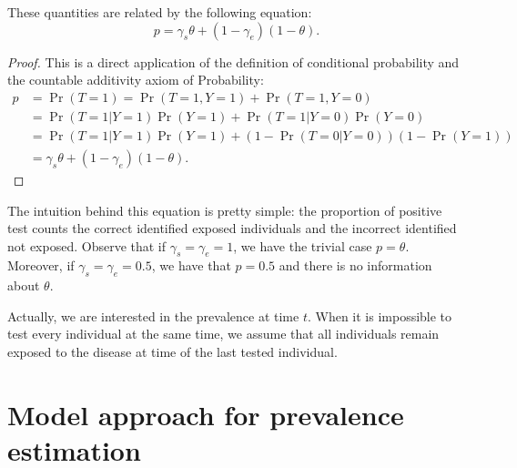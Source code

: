\begin{theorem} These quantities are related by the following equation:
  \begin{equation}
    p = \gamma_s\theta + (1-\gamma_e)(1-\theta).
  \end{equation}
  
\end{theorem}

\begin{proof}
  This is a direct application of the definition of conditional probability
  and the countable additivity axiom of Probability:
  \begin{equation*}
    \begin{split}
      p &= \Pr(T = 1) = \Pr(T = 1, Y = 1) + \Pr(T = 1, Y = 0) \\
      &= \Pr(T=1|Y=1)\Pr(Y=1) + \Pr(T=1|Y=0)\Pr(Y=0) \\
      &= \Pr(T=1|Y=1)\Pr(Y=1) + (1 - \Pr(T=0|Y=0))(1-\Pr(Y=1)) \\
      &= \gamma_s\theta + (1 - \gamma_e)(1-\theta).
    \end{split}
  \end{equation*} 
\end{proof}

The intuition behind this equation is pretty simple: the proportion
of positive test counts the correct identified exposed individuals and the
incorrect identified not exposed. Observe that if $\gamma_s = \gamma_e = 1$, we have the trivial case $p =
\theta$. Moreover, if $\gamma_s = \gamma_e = 0.5$, we have that
$p = 0.5$ and there is no information about $\theta$. 

\begin{remark}
  Actually, we are interested in the prevalence at time $t$. When it is 
  impossible to test every individual at the same time, we assume that all
  individuals remain exposed to the disease at time of the last tested individual. 
\end{remark}


\section{Model approach for prevalence estimation}

